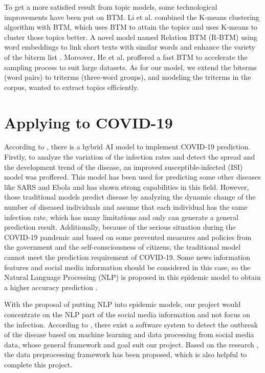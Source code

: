 To get a more satisfied result from topic models, some technological improvements have been put on BTM. Li et al. \cite{li2016micro} combined the K-means clustering algorithm with BTM, which uses BTM to attain the topics and uses K-means to cluster those topics better. A novel model named Relation BTM (R-BTM) using word embeddings to link short texts with similar words and enhance the variety of the biterm list \cite{li2019relational}. Moreover, He et al. \cite{he2017fastbtm} proffered a fast BTM to accelerate the sampling process to suit large datasets. As for our model, we extend the biterms (word pairs) to triterms (three-word groups), and modeling the triterms in the corpus, wanted to extract topics efficiently.

\section{Applying to COVID-19}
According to \cite{zheng2020predicting}, there is a hybrid AI model to implement COVID-19 prediction. Firstly, to analyze the variation of the infection rates and detect the spread and the development trend of the disease, an improved susceptible-infected (ISI) model was proffered. This model has been used for predicting some other diseases like SARS and Ebola and has shown strong capabilities in this field. However, those traditional models predict disease by analyzing the dynamic change of the number of diseased individuals and assume that each individual has the same infection rate, which has many limitations and only can generate a general prediction result. Additionally, because of the serious situation during the COVID-19 pandemic and based on some prevented measures and policies from the government and the self-consciousness of citizens, the traditional model cannot meet the prediction requirement of COVID-19. Some news information features and social media information should be considered in this case, so the Natural Language Processing (NLP) is proposed in this epidemic model to obtain a higher accuracy prediction \cite{zheng2020predicting}. 

With the proposal of putting NLP into epidemic models, our project would concentrate on the NLP part of the social media information and not focus on the infection. According to \cite{lee2013real}, there exist a software system to detect the outbreak of the disease based on machine learning and data processing from social media data, whose general framework and goal suit our project. Based on the research \cite{ramirez2017survey, uysal2014impact, jianqiang2017comparison}, the data preprocessing framework has been proposed, which is also helpful to complete this project. 

